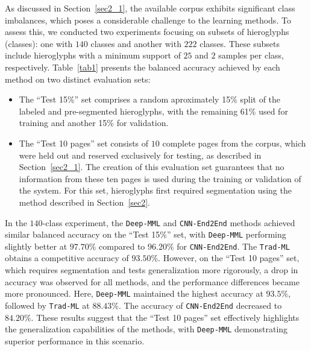 \documentclass[10pt,onecolumn,letterpaper]{article}
\newcommand{\method}[1]{\texttt{#1}}
\begin{document}
As discussed in Section~\ref{sec2_1}, the available corpus exhibits significant class imbalances, which poses a considerable challenge to the learning methods. To assess this, we conducted two experiments focusing on subsets of hieroglyphs (classes): one with $140$ classes and another with $222$ classes. These subsets include hieroglyphs with a minimum support of $25$ and $2$ samples per class, respectively. Table~\ref{tab1} presents the balanced accuracy achieved by each method on two distinct evaluation sets:
\begin{itemize}
	\item The ``Test 15\%'' set comprises a random aproximately 15\% split of the labeled and pre-segmented hieroglyphs, with the remaining 61\% used for training and another 15\% for validation.
	\item The ``Test 10 pages'' set consists of $10$ complete pages from the corpus, which were held out and reserved exclusively for testing, as described in Section~\ref{sec2_1}. The creation of this evaluation set guarantees that no information from these ten pages is used during the training or validation of the system. For this set, hieroglyphs first required segmentation using the method described in Section~\ref{sec2}.
	
	
\end{itemize}

In the $140$-class experiment, the \method{Deep-MML} and \method{CNN-End2End} methods achieved similar balanced accuracy on the ``Test 15\%'' set, with \method{Deep-MML} performing slightly better at $97.70\%$ compared to $96.20\%$ for \method{CNN-End2End}. The \method{Trad-ML} obtains a competitive accuracy of $93.50\%$. However, on the ``Test 10 pages'' set, which requires segmentation and tests generalization more rigorously, a drop in accuracy was observed for all methods, and the performance differences became more pronounced. Here, \method{Deep-MML} maintained the highest accuracy at $93.5\%$, followed by \method{Trad-ML} at $88.43\%$. The accuracy of \method{CNN-End2End} decreased to $84.20\%$. These results suggest that the ``Test 10 pages'' set effectively highlights the generalization capabilities of the methods, with \method{Deep-MML} demonstrating superior performance in this scenario. 
\end{document}
